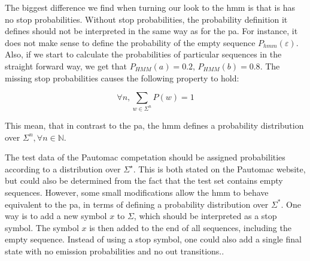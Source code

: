 The biggest difference we find when turning our look to the \gls{hmm} is that is has no stop probabilities.
Without stop probabilities, the probability definition it defines should not be interpreted in the same way as for the \gls{pa}. For instance, it does not make sense to define the probability of the empty sequence $P_{hmm}(\varepsilon)$. Also, if we start to calculate the probabilities of particular sequences in the straight forward way, we get that $P_{HMM}(a) = 0.2$, $P_{HMM}(b) = 0.8$. The missing stop probabilities causes the following property to hold:

\[\forall n, \sum_{w \in \Sigma^n} P(w) = 1\]

This mean, that in contrast to the \gls{pa}, the \gls{hmm} defines a probability distribution over $\Sigma^n, \forall n \in \mathbb{N}$\cite{Dupont:2005:LPA:1746577.1746601}.

The test data of the Pautomac competation should be assigned probabilities according to a distribution over $\Sigma^\star$.
This is both stated on the Pautomac website, but could also be determined from the fact that the test set contains empty sequences. However, some small modifications allow the \gls{hmm} to behave equivalent to the \gls{pa}, in terms of defining a probability distribution over $\Sigma^\ast$. One way is to add a new symbol $x$ to $\Sigma$, which should be interpreted as a stop symbol. The symbol $x$ is then added to the end of all sequences, including the empty sequence. Instead of using a stop symbol, one could also add a single final state with no emission probabilities and no out transitions.\cite{Dupont:2005:LPA:1746577.1746601}.